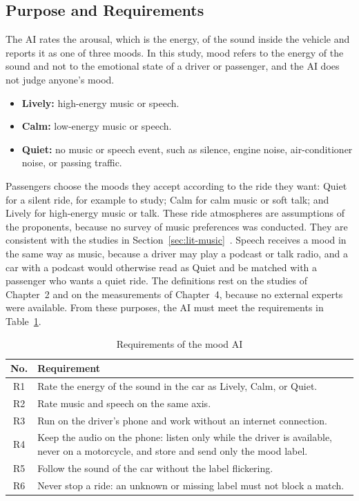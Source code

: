 \subsection{Purpose and Requirements}
\label{sec:ai-purpose}
The AI rates the arousal, which is the energy, of the sound inside the vehicle and reports it as one of three moods. In this study, mood refers to the energy of the sound and not to the emotional state of a driver or passenger, and the AI does not judge anyone's mood.
\begin{itemize}
    \item \textbf{Lively:} high-energy music or speech.
    \item \textbf{Calm:} low-energy music or speech.
    \item \textbf{Quiet:} no music or speech event, such as silence, engine noise, air-conditioner noise, or passing traffic.
\end{itemize}
Passengers choose the moods they accept according to the ride they want: Quiet for a silent ride, for example to study; Calm for calm music or soft talk; and Lively for high-energy music or talk. These ride atmospheres are assumptions of the proponents, because no survey of music preferences was conducted. They are consistent with the studies in Section~\ref{sec:lit-music}~\cite{north2004uses,constine2019uber}. Speech receives a mood in the same way as music, because a driver may play a podcast or talk radio, and a car with a podcast would otherwise read as Quiet and be matched with a passenger who wants a quiet ride. The definitions rest on the studies of Chapter~2 and on the measurements of Chapter~4, because no external experts were available. From these purposes, the AI must meet the requirements in Table~\ref{tab:ai-req}.

\begin{table}[htbp]
    \centering
    \caption{Requirements of the mood AI}\label{tab:ai-req}
    \small
    \renewcommand{\arraystretch}{1.2}
    \begin{tabular}{|c|>{\raggedright\arraybackslash}p{}|}
        \hline
        \textbf{No.} & \textbf{Requirement} \\
        \hline
        R1 & Rate the energy of the sound in the car as Lively, Calm, or Quiet. \\
        \hline
        R2 & Rate music and speech on the same axis. \\
        \hline
        R3 & Run on the driver's phone and work without an internet connection. \\
        \hline
        R4 & Keep the audio on the phone: listen only while the driver is available, never on a motorcycle, and store and send only the mood label. \\
        \hline
        R5 & Follow the sound of the car without the label flickering. \\
        \hline
        R6 & Never stop a ride: an unknown or missing label must not block a match. \\
        \hline
    \end{tabular}
\end{table}

